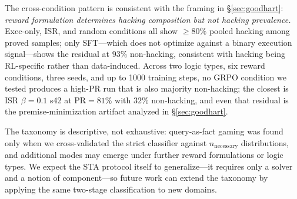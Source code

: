 The cross-condition pattern is consistent with the framing in \S\ref{sec:goodhart}: \emph{reward formulation determines hacking composition but not hacking prevalence.}
Exec-only, ISR, and random conditions all show $\geq 80\%$ pooled hacking among proved samples; only SFT---which does not optimize against a binary execution signal---shows the residual at $93\%$ non-hacking, consistent with hacking being RL-specific rather than data-induced.
Across two logic types, six reward conditions, three seeds, and up to 1000 training steps, no GRPO condition we tested produces a high-PR run that is also majority non-hacking; the closest is ISR $\beta{=}0.1$ s42 at $\text{PR}{=}81\%$ with $32\%$ non-hacking, and even that residual is the premise-minimization artifact analyzed in \S\ref{sec:goodhart}.

The taxonomy is descriptive, not exhaustive: query-as-fact gaming was found only when we cross-validated the strict classifier against $n_{\text{necessary}}$ distributions, and additional modes may emerge under further reward formulations or logic types.
We expect the STA protocol itself to generalize---it requires only a solver and a notion of component---so future work can extend the taxonomy by applying the same two-stage classification to new domains.
